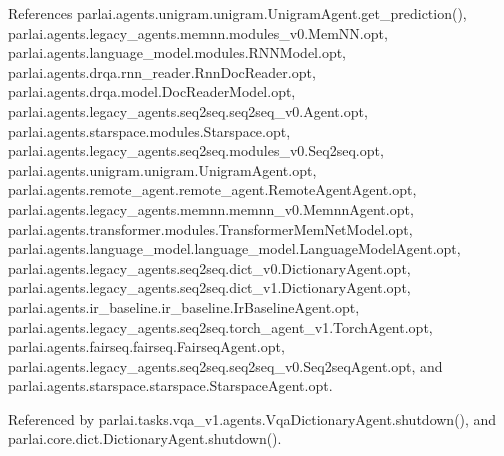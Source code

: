 References parlai.\+agents.\+unigram.\+unigram.\+Unigram\+Agent.\+get\+\_\+prediction(), parlai.\+agents.\+legacy\+\_\+agents.\+memnn.\+modules\+\_\+v0.\+Mem\+N\+N.\+opt, parlai.\+agents.\+language\+\_\+model.\+modules.\+R\+N\+N\+Model.\+opt, parlai.\+agents.\+drqa.\+rnn\+\_\+reader.\+Rnn\+Doc\+Reader.\+opt, parlai.\+agents.\+drqa.\+model.\+Doc\+Reader\+Model.\+opt, parlai.\+agents.\+legacy\+\_\+agents.\+seq2seq.\+seq2seq\+\_\+v0.\+Agent.\+opt, parlai.\+agents.\+starspace.\+modules.\+Starspace.\+opt, parlai.\+agents.\+legacy\+\_\+agents.\+seq2seq.\+modules\+\_\+v0.\+Seq2seq.\+opt, parlai.\+agents.\+unigram.\+unigram.\+Unigram\+Agent.\+opt, parlai.\+agents.\+remote\+\_\+agent.\+remote\+\_\+agent.\+Remote\+Agent\+Agent.\+opt, parlai.\+agents.\+legacy\+\_\+agents.\+memnn.\+memnn\+\_\+v0.\+Memnn\+Agent.\+opt, parlai.\+agents.\+transformer.\+modules.\+Transformer\+Mem\+Net\+Model.\+opt, parlai.\+agents.\+language\+\_\+model.\+language\+\_\+model.\+Language\+Model\+Agent.\+opt, parlai.\+agents.\+legacy\+\_\+agents.\+seq2seq.\+dict\+\_\+v0.\+Dictionary\+Agent.\+opt, parlai.\+agents.\+legacy\+\_\+agents.\+seq2seq.\+dict\+\_\+v1.\+Dictionary\+Agent.\+opt, parlai.\+agents.\+ir\+\_\+baseline.\+ir\+\_\+baseline.\+Ir\+Baseline\+Agent.\+opt, parlai.\+agents.\+legacy\+\_\+agents.\+seq2seq.\+torch\+\_\+agent\+\_\+v1.\+Torch\+Agent.\+opt, parlai.\+agents.\+fairseq.\+fairseq.\+Fairseq\+Agent.\+opt, parlai.\+agents.\+legacy\+\_\+agents.\+seq2seq.\+seq2seq\+\_\+v0.\+Seq2seq\+Agent.\+opt, and parlai.\+agents.\+starspace.\+starspace.\+Starspace\+Agent.\+opt.



Referenced by parlai.\+tasks.\+vqa\+\_\+v1.\+agents.\+Vqa\+Dictionary\+Agent.\+shutdown(), and parlai.\+core.\+dict.\+Dictionary\+Agent.\+shutdown().

